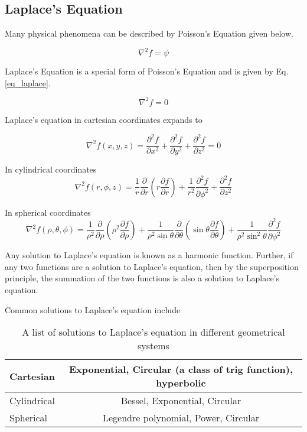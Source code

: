 \documentclass{article}
\numberwithin{equation}{subsection}
\begin{document}
\subsection{Laplace's Equation} \label{sec_laplace}
Many physical phenomena can be described by Poisson's Equation given below.

\begin{equation} \label{eq_poisson}
\nabla^2 f = \psi
\end{equation}

Laplace's Equation is a special form of Poisson's Equation and is given by Eq. \ref{eq_laplace}.


\begin{equation} \label{eq_laplace}
\nabla^2 f = 0
\end{equation}

Laplace's equation in cartesian coordinates expands to

\begin{equation} \label{eq_laplace_cartesian}
\nabla^2 f(x, y, z) = \frac{\partial^2 f}{\partial x^2} + \frac{\partial^2 f}{\partial y^2} + \frac{\partial^2 f}{\partial z^2} = 0
\end{equation}

In cylindrical coordinates
\begin{equation} \label{eq_laplace_cylindrical}
\nabla^2 f(r, \phi, z) = \frac{1}{r} \frac{\partial}{\partial r}\left( r \frac{\partial f}{\partial r}\right) + \frac{1}{r^2}\frac{\partial^2 f}{\partial \phi^2} + \frac{\partial^2 f}{\partial z^2}
\end{equation}

In spherical coordinates
\begin{equation} \label{eq_laplace_spherical}
\nabla^2 f(\rho, \theta, \phi) = \frac{1}{\rho^2}\frac{\partial}{\partial \rho} \left( \rho^2 \frac{\partial f}{\partial \rho}\right) + \frac{1}{\rho^2 \sin \theta}\frac{\partial}{\partial \theta}\left( \sin \theta \frac{\partial f}{\partial \theta}\right) + \frac{1}{\rho^2 \sin^2 \theta} \frac{\partial^2 f}{\partial \phi^2}
\end{equation}

Any solution to Laplace's equation is known as a harmonic function. Further, if any two functions are a solution to Laplace's equation, then by the superposition principle, the summation of the two functions is also a solution to Laplace's equation.

Common solutions to Laplace's equation include

\begin{table}
\begin{center}
\label{tbl_laplace_solutions}
\caption{A list of solutions to Laplace's equation in different geometrical systems}
\begin{tabular}{|l|c|}
\hline
Cartesian & Exponential, Circular (a class of trig function), hyperbolic \\ \hline
Cylindrical & Bessel, Exponential, Circular \\ \hline
Spherical & Legendre polynomial, Power, Circular \\ \hline
\end{tabular}
\end{center}
\end{table}
\end{document}
